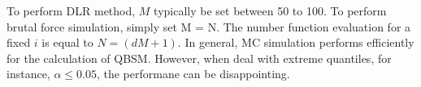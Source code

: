 \noindent
To perform DLR method, $M$ typically be set between 50 to 100\citep{kucherenko2017DifferentNumericalEstimators}. To perform brutal force simulation,
simply set M = N. The number function evaluation for a fixed $i$ is equal to $N=(dM + 1)$. In general, MC simulation performs efficiently for the calculation of QBSM. However, when deal with extreme quantiles, for instance, $\alpha \le 0.05$, the performane can be disappointing.


